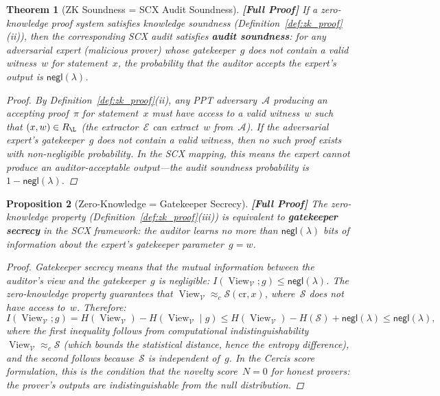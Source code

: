 \documentclass[12pt,a4paper]{article}
\newtheorem{theorem}{Theorem}[section]
\newtheorem{proposition}[theorem]{Proposition}
\theoremstyle{remark}
\newcommand{\SCX}{\textsf{SCX}}
\newcommand{\Cercis}{\textsf{Cercis}}
\newcommand{\Verifier}{\mathcal{V}}
\newcommand{\Adv}{\mathcal{A}}
\newcommand{\Sim}{\mathcal{S}}
\newcommand{\Ext}{\mathcal{E}}
\newcommand{\negl}{\textsf{negl}}
\DeclareMathOperator{\View}{View}
\newcommand{\rigorFull}{\textbf{[Full Proof]}}
\begin{document}
\begin{theorem}[ZK Soundness = SCX Audit Soundness]
\label{thm:zk_soundness}
\rigorFull
If a zero-knowledge proof system satisfies knowledge soundness (Definition~\ref{def:zk_proof}(ii)), then the corresponding \SCX{} audit satisfies \textbf{audit soundness}: for any adversarial expert (malicious prover) whose gatekeeper~$g$ does not contain a valid witness~$w$ for statement~$x$, the probability that the auditor accepts the expert's output is $\negl(\lambda)$.

\begin{proof}
By Definition~\ref{def:zk_proof}(ii), any PPT adversary~$\Adv$ producing an accepting proof~$\pi$ for statement~$x$ must have access to a valid witness~$w$ such that $(x, w) \in R_{\L}$ (the extractor~$\Ext$ can extract~$w$ from~$\Adv$). If the adversarial expert's gatekeeper~$g$ does not contain a valid witness, then no such proof exists with non-negligible probability. In the \SCX{} mapping, this means the expert cannot produce an auditor-acceptable output---the audit soundness probability is $1 - \negl(\lambda)$.
\end{proof}
\end{theorem}

\begin{proposition}[Zero-Knowledge = Gatekeeper Secrecy]
\label{prop:zk_gatekeeper_secrecy}
\rigorFull
The zero-knowledge property (Definition~\ref{def:zk_proof}(iii)) is equivalent to \textbf{gatekeeper secrecy} in the \SCX{} framework: the auditor learns no more than $\negl(\lambda)$ bits of information about the expert's gatekeeper parameter~$g = w$.

\begin{proof}
Gatekeeper secrecy means that the mutual information between the auditor's view and the gatekeeper~$g$ is negligible: $I(\View_{\Verifier}; g) \leq \negl(\lambda)$. The zero-knowledge property guarantees that $\View_{\Verifier} \approx_c \Sim(\text{cr}, x)$, where~$\Sim$ does not have access to~$w$. Therefore:
\begin{equation}
  I(\View_{\Verifier}; g) = H(\View_{\Verifier}) - H(\View_{\Verifier} \mid g) \leq H(\View_{\Verifier}) - H(\Sim) + \negl(\lambda) \leq \negl(\lambda),
\end{equation}
where the first inequality follows from computational indistinguishability~$\View_{\Verifier} \approx_c \Sim$ (which bounds the statistical distance, hence the entropy difference), and the second follows because~$\Sim$ is independent of~$g$. In the \Cercis{} score formulation, this is the condition that the novelty score~$N = 0$ for honest provers: the prover's outputs are indistinguishable from the null distribution.
\end{proof}
\end{proposition}
\end{document}
